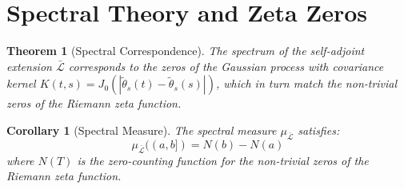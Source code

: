 \documentclass{article}
\newtheorem{corollary}{Corollary}
\newtheorem{theorem}{Theorem}
\begin{document}
\section{Spectral Theory and Zeta Zeros}

\begin{theorem}
  [Spectral Correspondence] The spectrum of the self-adjoint extension
  $\bar{\mathcal{L}}$ corresponds to the zeros of the Gaussian process with
  covariance kernel $K (t, s) = J_0 (| \tilde{\theta}_s (t) - \tilde{\theta}_s
  (s) |)$, which in turn match the non-trivial zeros of the Riemann zeta
  function.
\end{theorem}

\begin{corollary}
  [Spectral Measure] The spectral measure $\mu_{\bar{\mathcal{L}}}$ satisfies:
  \begin{equation}
    \mu_{\bar{\mathcal{L}}} ((a, b]) = N (b) - N (a)
  \end{equation}
  where $N (T)$ is the zero-counting function for the non-trivial zeros of the
  Riemann zeta function.
\end{corollary}
\end{document}
